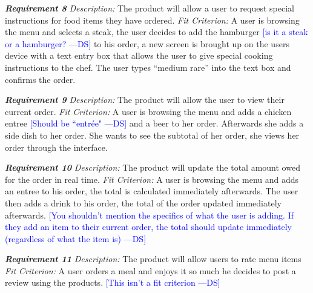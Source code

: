 \documentclass[12pt, titlepage]{article}
\newcommand{\authornote}[3]{\textcolor{#1}{[#3 ---#2]}}
\newcommand{\authornote}[3]{}
\newcommand{\ds}[1]{\authornote{blue}{DS}{#1}}
\begin{document}
\noindent\textbf{\textit{Requirement 8}}\newline
\textit{Description:}\newline
The product will allow a user to request special instructions for food items they have ordered. \newline\newline
\textit{Fit Criterion:}\newline 
A user is browsing the menu and selects a steak, the user decides to add the hamburger
\ds{is it a steak or a hamburger?}
to his order, a new screen is brought up on the users device with a text entry box that allows the user to give special cooking instructions to the chef. The user types “medium rare” into the text box and confirms the order.
\newline

\noindent\textbf{\textit{Requirement 9}}\newline
\textit{Description:}\newline
The product will allow the user to view their current order. \newline\newline
\textit{Fit Criterion:}\newline 
A user is browsing the menu and adds a chicken entree \ds{Should be ``entr\'{e}e"}
 and a beer to her order. Afterwards she adds a side dish to her order. She wants to see the subtotal of her order, she views her order through the interface.
\newline

\noindent\textbf{\textit{Requirement 10}}\newline
\textit{Description:}\newline
The product will update the total amount owed for the order in real time. \newline\newline
\textit{Fit Criterion:}\newline 
A user is browsing the menu and adds an entree to his order, the total is calculated immediately afterwards. The user then adds a drink to his order, the total of the order updated immediately afterwards. 
\ds{You shouldn't mention the specifics of what the user is adding. If they add
an item to their current order, the total should update immediately (regardless
of what the item is)}
\newline

\noindent\textbf{\textit{Requirement 11}}\newline
\textit{Description:}\newline
The product will allow users to rate menu items \newline\newline
\textit{Fit Criterion:}\newline 
A user orders a meal and enjoys it so much he decides to post a review using the products. \ds{This isn't a fit criterion}
\newline
\end{document}
